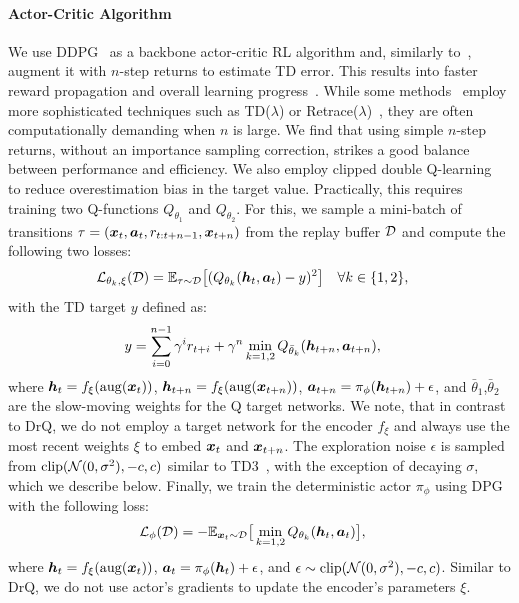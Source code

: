 \paragraph{Actor-Critic Algorithm}
We use DDPG~\citep{lillicrap2015ddpg} as a backbone actor-critic RL algorithm and, similarly to~\cite{barth-maron2018d4pg}, augment it with $n$-step returns to estimate TD error. This results into faster reward propagation and overall learning progress~\citep{mnih2016a3c}. While some methods~\citep{hafner2020dreamerv2} employ more sophisticated techniques such as TD($\lambda$) or Retrace($\lambda$)~\citep{munos2016retrace}, they are often computationally demanding when $n$ is large. We find that using simple $n$-step returns, without an importance sampling correction, strikes a good balance between performance and efficiency. We also employ clipped double Q-learning~\citep{fujimoto2018td3} to reduce overestimation bias in the target value. Practically, this requires training two Q-functions $Q_{\theta_1}$ and $Q_{\theta_2}$. For this, we sample a mini-batch of transitions $\tau =( {\bm{x}}_t,{\bm{a}}_t, r_{t:t+n-1}, {\bm{x}}_{t+n})$ from the replay buffer ${\mathcal{D}}$ and compute the following two losses:
\begin{align}
    {\mathcal{L}}_{\theta_k, \xi}({\mathcal{D}}) &= \mathbb{E}_{\tau \sim {\mathcal{D}} }\big[(Q_{\theta_k}({\bm{h}}_t, {\bm{a}}_t) - y) ^2 \big] \quad  \forall k \in \{1,2\},
\label{eq:critic}
\end{align}
with the TD target $y$ defined as:
\begin{align*}
    y &= \sum_{i=0}^{n-1} \gamma^i r_{t+i} + \gamma^n \min_{k=1,2} Q_{\bar{\theta}_k}({\bm{h}}_{t+n}, {\bm{a}}_{t+n}),
\end{align*}
where  ${\bm{h}}_t = f_\xi(\mathrm{aug}({\bm{x}}_t))$, ${\bm{h}}_{t+n}=f_\xi(\mathrm{aug}({\bm{x}}_{t+n}))$, ${\bm{a}}_{t+n} = \pi_{\phi}({\bm{h}}_{t+n}) + \epsilon$, and $\bar{\theta}_1$,$\bar{\theta}_2$ are the slow-moving weights for the Q target networks. We note, that in contrast to DrQ, we do not employ a target network for the encoder $f_\xi$ and always use the most recent weights $\xi$ to embed ${\bm{x}}_t$ and ${\bm{x}}_{t+n}$. The exploration noise $\epsilon$ is sampled from $\mathrm{clip}({\mathcal{N}}(0, \sigma^2), -c, c)$ similar to TD3~\citep{fujimoto2018td3}, with the exception of decaying $\sigma$, which we describe below. Finally, we train the deterministic actor $\pi_\phi$ using DPG with the following loss:
\begin{align}
    {\mathcal{L}}_{\phi}({\mathcal{D}}) &= -\mathbb{E}_{{\bm{x}}_t \sim {\mathcal{D}}} \big[\min_{k=1,2} Q_{\theta_k} ({\bm{h}}_t, {\bm{a}}_t) \big], 
\label{eq:actor}
\end{align}
where  ${\bm{h}}_{t}=f_\xi(\mathrm{aug}({\bm{x}}_{t}))$, ${\bm{a}}_{t} = \pi_{\phi}({\bm{h}}_{t}) + \epsilon$, and $\epsilon \sim \mathrm{clip}({\mathcal{N}}(0, \sigma^2), -c, c)$. Similar to DrQ, we do not use actor's gradients to update the encoder's parameters $\xi$.

